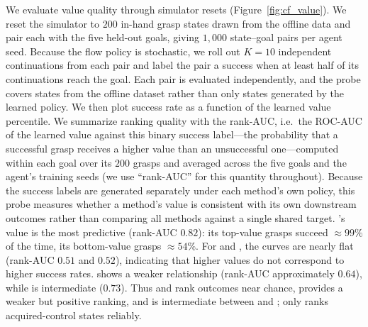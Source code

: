 We evaluate value quality through simulator resets (Figure~\ref{fig:cf_value}).
We reset the simulator to $200$ in-hand grasp states drawn from the offline data and pair each with the five held-out goals, giving $1{,}000$ state--goal pairs per agent seed.
Because the flow policy is stochastic, we roll out $K{=}10$ independent continuations from each pair and label the pair a success when at least half of its continuations reach the goal.
Each pair is evaluated independently, and the probe covers states from the offline dataset rather than only states generated by the learned policy.
We then plot success rate as a function of the learned value percentile.
We summarize ranking quality with the rank-AUC, i.e.\ the ROC-AUC of the learned value against this binary success label---the probability that a successful grasp receives a higher value than an unsuccessful one---computed within each goal over its $200$ grasps and averaged across the five goals and the agent's training seeds (we use ``rank-AUC'' for this quantity throughout).
Because the success labels are generated separately under each method's own policy, this probe measures whether a method's value is consistent with its own downstream outcomes rather than comparing all methods against a single shared target.
\gciql{}'s value is the most predictive (rank-AUC $0.82$): its top-value grasps succeed ${\approx}99\%$ of the time, its bottom-value grasps ${\approx}54\%$.
For \rldp{} and \psm{}, the curves are nearly flat (rank-AUC $0.51$ and $0.52$), indicating that higher values do not correspond to higher success rates.
\fb{} shows a weaker relationship (rank-AUC approximately $0.64$), while \crl{} is intermediate ($0.73$).
Thus \rldp{} and \psm{} rank outcomes near chance, \fb{} provides a weaker but positive ranking, and \crl{} is intermediate between \fb{} and \gciql{}; only \gciql{} ranks acquired-control states reliably.

